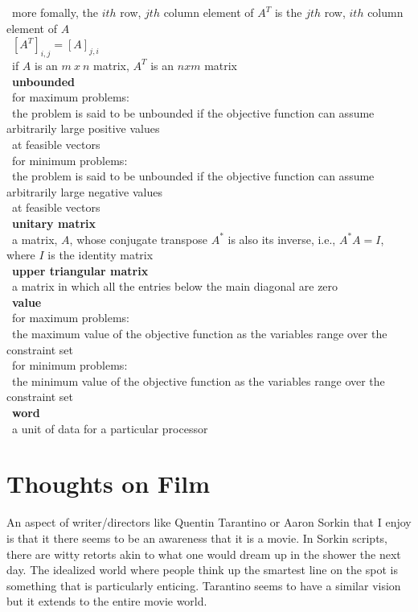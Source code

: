 \documentclass[10pt,letterpaper]{scrartcl}
\newcommand{\tbul}{\textbullet}
\newcommand{\tend}{\>\textendash}
\newcommand{\tasc}{\>\>\textasteriskcentered}
\newcommand{\tpec}{\>\>\>\textperiodcentered}
\begin{document}
\begin{tabbing}
\tasc\ more fomally, the $ith$ row, $jth$ column element of $A^T$ is the $jth$ row, $ith$ column element of $A$ \\
\tpec\ $[A^T]_{i,j} = [A]_{j,i}$ \\
\tasc\ if $A$ is an $m\ x\ n$ matrix, $A^T$ is an $nxm$ matrix \\
\tbul\ \textbf{unbounded} \\
\tend\ for maximum problems: \\
\tasc\ the problem is said to be unbounded if the objective function can assume arbitrarily large positive values \\ \>\>\ at feasible vectors \\
\tend\ for minimum problems: \\
\tasc\ the problem is said to be unbounded if the objective function can assume arbitrarily large negative values \\ \>\>\ at feasible vectors \\
\tbul\ \textbf{unitary matrix} \\
\tend\ a matrix, $A$, whose conjugate transpose $A^*$ is also its inverse, i.e., $A^*A=I$, where $I$ is the identity matrix \\
\tbul\ \textbf{upper triangular matrix} \\
\tend\ a matrix in which all the entries below the main diagonal are zero \\
\tbul\ \textbf{value} \\
\tend\ for maximum problems: \\ 
\tasc\ the maximum value of the objective function as the variables range over the constraint set \\
\tend\ for minimum problems: \\
\tasc\ the minimum value of the objective function as the variables range over the constraint set \\
\tbul\ \textbf{word} \\
\tend\ a unit of data for a particular processor \\

\end{tabbing}

\newpage\section{Thoughts on Film}
An aspect of writer/directors like Quentin Tarantino or Aaron Sorkin that I enjoy is that it there seems to be an awareness that it is a movie. In Sorkin scripts, there are witty retorts akin to what one would dream up in the shower the next day. The idealized world where people think up the smartest line on the spot is something that is particularly enticing. Tarantino seems to have a similar vision but it extends to the entire movie world. 
\end{document}

